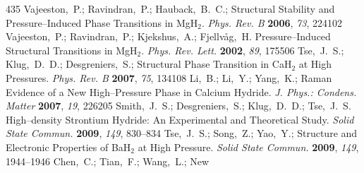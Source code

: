 \documentclass[12pt,letterpaper,oneside]{article}
\begin{document}
\begin{mcitethebibliography}{435}
Vajeeston,~P.; Ravindran,~P.; Hauback,~B.~C.;
    Structural Stability and Pressure--Induced Phase Transitions
  in MgH$_2$. \emph{Phys. Rev. B} \textbf{2006}, \emph{73}, 224102\relax
\mciteBstWouldAddEndPuncttrue
\mciteSetBstMidEndSepPunct{\mcitedefaultmidpunct}
{\mcitedefaultendpunct}{\mcitedefaultseppunct}\relax
\EndOfBibitem
{}
Vajeeston,~P.; Ravindran,~P.; Kjekshus,~A.; Fjellv{\aa}g,~H. Pressure--Induced
  Structural Transitions in MgH$_2$. \emph{Phys. Rev. Lett.} \textbf{2002},
  \emph{89}, 175506\relax
\mciteBstWouldAddEndPuncttrue
\mciteSetBstMidEndSepPunct{\mcitedefaultmidpunct}
{\mcitedefaultendpunct}{\mcitedefaultseppunct}\relax
\EndOfBibitem
{}
Tse,~J.~S.; Klug,~D.~D.; Desgreniers,~S.;
    Structural Phase Transition in CaH$_2$ at High Pressures.
  \emph{Phys. Rev. B} \textbf{2007}, \emph{75}, 134108\relax
\mciteBstWouldAddEndPuncttrue
\mciteSetBstMidEndSepPunct{\mcitedefaultmidpunct}
{\mcitedefaultendpunct}{\mcitedefaultseppunct}\relax
\EndOfBibitem
{}
Li,~B.; Li,~Y.; Yang,~K.;   Raman Evidence of a
  New High--Pressure Phase in Calcium Hydride. \emph{J. Phys.: Condens. Matter}
  \textbf{2007}, \emph{19}, 226205\relax
\mciteBstWouldAddEndPuncttrue
\mciteSetBstMidEndSepPunct{\mcitedefaultmidpunct}
{\mcitedefaultendpunct}{\mcitedefaultseppunct}\relax
\EndOfBibitem
{}
Smith,~J.~S.; Desgreniers,~S.; Klug,~D.~D.; Tse,~J.~S. High--density Strontium
  Hydride: An Experimental and Theoretical Study. \emph{Solid State Commun.}
  \textbf{2009}, \emph{149}, 830--834\relax
\mciteBstWouldAddEndPuncttrue
\mciteSetBstMidEndSepPunct{\mcitedefaultmidpunct}
{\mcitedefaultendpunct}{\mcitedefaultseppunct}\relax
\EndOfBibitem
{}
Tse,~J.~S.; Song,~Z.; Yao,~Y.; 
  Structure and Electronic Properties of BaH$_2$ at High Pressure. \emph{Solid
  State Commun.} \textbf{2009}, \emph{149}, 1944--1946\relax
\mciteBstWouldAddEndPuncttrue
\mciteSetBstMidEndSepPunct{\mcitedefaultmidpunct}
{\mcitedefaultendpunct}{\mcitedefaultseppunct}\relax
\EndOfBibitem
{}
Chen,~C.; Tian,~F.; Wang,~L.;   New

\end{mcitethebibliography}
\end{document}
